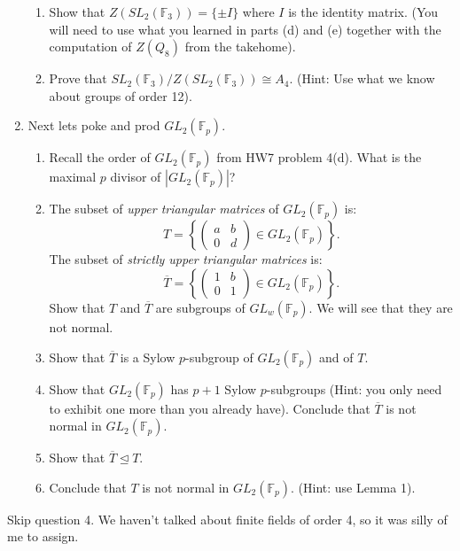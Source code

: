 \documentclass[11pt]{article}
\newcommand{\bF}{\mathbb{F}}
\begin{document}
\begin{enumerate}
{\begin{enumerate}
{    }
    \item{
    Show that $Z(SL_2(\bF_3)) = \{\pm I\}$ where $I$ is the identity matrix.  (You will need to use what you learned in parts (d) and (e) together with the computation of $Z(Q_8)$ from the takehome).
    }
    \item{
    Prove that $SL_2(\bF_3)/Z(SL_2(\bF_3))\cong A_4$.  (Hint: Use what we know about groups of order 12).
    }
  \end{enumerate}
  }
  \newpage
  \item{
  Next lets poke and prod $GL_2(\bF_p)$.
  \begin{enumerate}
    \item{
    Recall the order of $GL_2(\bF_p)$ from HW7 problem 4(d).  What is the maximal $p$ divisor of $|GL_2(\bF_p)|$?
    }
    \item{
    The subset of \textit{upper triangular matrices} of $GL_2(\bF_p)$ is:
    \[T = \left\{\begin{pmatrix}a & b\\0 & d\end{pmatrix}\in GL_2(\bF_p)\right\}.\]
    The subset of \textit{strictly upper triangular matrices} is:
    \[\overline T = \left\{\begin{pmatrix}1 & b\\0 & 1\end{pmatrix}\in GL_2(\bF_p)\right\}.\]
    Show that $T$ and $\overline T$ are subgroups of $GL_w(\bF_p)$.  We will see that they are not normal.
    }
    \item{
    Show that $\overline T$ is a Sylow $p$-subgroup of $GL_2(\bF_p)$ and of $T$.
    }
    \item{
    Show that $GL_2(\bF_p)$ has $p+1$ Sylow $p$-subgroups (Hint: you only need to exhibit one more than you already have).  Conclude that $\overline T$ is not normal in $GL_2(\bF_p)$.
    }
    \item{
    Show that $\overline T\unlhd T$.
    }
    \item{
    Conclude that $T$ is not normal in $GL_2(\bF_p)$.  (Hint: use Lemma 1).
    }
  \end{enumerate}
  }
\end{enumerate}
\color{red} Skip question 4.  We haven't talked about finite fields of order 4, so it was silly of me to assign.
\end{document}
